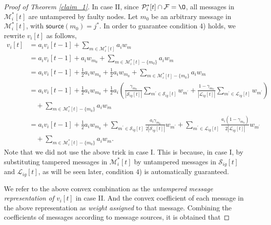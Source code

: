 \documentclass[letterpaper, 11pt]{article}
\newcommand{\calF}{{\mathcal{F}}}
\newcommand{\calL}{{\mathcal{L}}}
\newcommand{\calM}{{\mathcal{M}}}
\newcommand{\calP}{{\mathcal{P}}}
\newcommand{\calS}{{\mathcal{S}}}
\begin{document}
\begin{proof}[Proof of Theorem \ref{claim_1}]
In case II, since $\calP_i^{*}[t]\cap \calF=\O$, all messages in $\calM^*_i[t]$ are untampered by faulty nodes. Let $m_0$ be an arbitrary message in $\calM^*_i[t]$, with $\mathsf{source}(m_0)=j^*$. In order to guarantee condition 4) holds, we rewrite $v_i[t]$ as follows,
\begin{align*}
v_i[t]&=a_iv_i[t-1]+\sum_{m\in \calM_i^*[t]}a_iw_m\\
      &=a_iv_i[t-1]+a_iw_{m_0}+\sum_{m\in \calM_i^*[t]-\{m_0\}}a_iw_m\\
      &=a_iv_i[t-1]+\frac{1}{2}a_iw_{m_0}+\frac{1}{2}a_iw_{m_0}+\sum_{m\in \calM_i^*[t]-\{m_0\}}a_iw_m\\
      &=a_iv_i[t-1]+\frac{1}{2}a_iw_{m_0}+\frac{1}{2}a_i(\frac{\gamma_{m_0}}{|\calS_{ig}[t]|}\sum_{m^{\prime}\in \calS_{ig}[t]}w_{m^{\prime}}+\frac{1-\gamma_{m_0}}{|\calL_{ig}[t]|}\sum_{m^{\prime}\in \calL_{ig}[t]}w_{m^{\prime}})\\
      &\quad+\sum_{m\in \calM_i^*[t]-\{m_0\}}a_iw_m\\
      &=a_iv_i[t-1]+\frac{1}{2}a_iw_{m_0}+\sum_{m^{\prime}\in \calS_{ig}[t]}\frac{a_i\gamma_{m_0}}{2|\calS_{ig}[t]|}w_{m^{\prime}}+\sum_{m^{\prime}\in \calL_{ig}[t]}\frac{a_i(1-\gamma_{m_0})}{2|\calL_{ig}[t]|}w_{m^{\prime}}\\
      &\quad+\sum_{m\in \calM_i^*[t]-\{m_0\}}a_iw_m.
\end{align*}
Note that we did not use the above trick in case I. This is because, in case I, by substituting tampered messages in $\calM_i^*[t]$ by untampered messages in $\calS_{ig}[t]$ and $\calL_{ig}[t]$, as will be seen later, condition 4) is automatically guaranteed.

We refer to the above convex combination as the \emph{untampered message representation of $v_i[t]$} in case II. And the convex coefficient of each message in the above representation as \emph{weight assigned} to that message. Combining the coefficients of messages according to message sources, it is obtained that


\end{proof}
\end{document}
